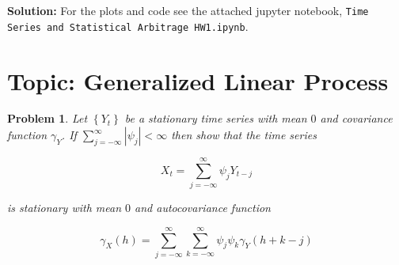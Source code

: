 \documentclass[11pt]{article}
\theoremstyle{plain} %
\newtheorem{problem}[theorem]{Problem}
\newenvironment{solution}
{\color{C2}\normalfont\begin{framed}\begingroup\textbf{Solution:} }
  {\endgroup\end{framed}}
\theoremstyle{remark}
\begin{document}
\begin{solution} For the plots and code see the attached jupyter notebook, \texttt{Time Series and Statistical Arbitrage HW1.ipynb}.
\end{solution}


\section{Topic: Generalized Linear Process}
\begin{problem}\label{prob:generalized linear process}
Let $\left\{Y_{t}\right\}$ be a stationary time series with mean $0$ and covariance function $\gamma_{Y}$. If $\sum_{j=-\infty}^{\infty}\left|\psi_{j}\right|<\infty$ then show that the time series

$$
	X_{t}=\sum_{j=-\infty}^{\infty} \psi_{j} Y_{t-j}
$$

is stationary with mean $0$ and autocovariance function

$$
	\gamma_{X}(h)=\sum_{j=-\infty}^{\infty} \sum_{k=-\infty}^{\infty} \psi_{j} \psi_{k} \gamma_{Y}(h+k-j)
$$
\end{problem}
\end{document}
